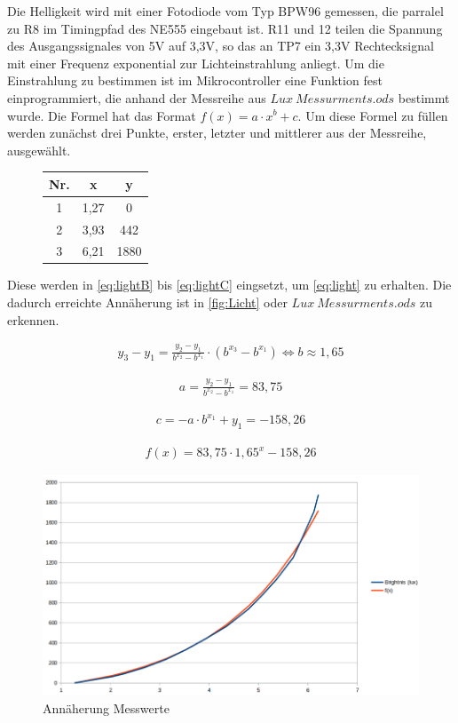 \documentclass[12pt, a4paper, oneside]{report}
\begin{document}
Die Helligkeit wird mit einer Fotodiode vom Typ BPW96 \cite{ds:light} gemessen, die parralel zu R8 im Timingpfad des NE555 eingebaut ist. R11 und 12 teilen die Spannung des Ausgangssignales von 5V auf 3,3V, so das an TP7 ein 3,3V Rechtecksignal mit einer Frequenz exponential zur Lichteinstrahlung anliegt. Um die Einstrahlung zu bestimmen ist im Mikrocontroller eine Funktion fest einprogrammiert, die anhand der Messreihe aus $Lux~Messurments.ods$ bestimmt wurde. Die Formel hat das Format $f(x)=a \cdot x^b + c$. Um diese Formel zu füllen werden zunächst drei Punkte, erster, letzter und mittlerer aus der Messreihe, ausgewählt.

\begin{figure}[h]
\centering
\begin{tabular}{c|c|c}
	Nr. & x & y\\
	\hline
	1 & 1,27 & 0\\
	2 & 3,93 & 442\\
	3 & 6,21 & 1880\\
\end{tabular}
\end{figure}

Diese werden in \autoref{eq:lightB} bis \ref{eq:lightC} eingsetzt, um \autoref{eq:light} zu erhalten. Die dadurch erreichte Annäherung ist in \autoref{fig:Licht} oder $Lux~Messurments.ods$ zu erkennen.

\begin{align}
y_3-y_1=\frac{y_2-y_1}{b^{x_2}-b^{x_1}}\cdot(b^{x_3}-b^{x_1}) \iff b \approx 1,65
\label{eq:lightB}
\end{align}

\begin{align}
a=\frac{y_2-y_1}{b^{x_2}-b^{x_1}} = 83,75
\label{eq:lightA}
\end{align}

\begin{align}
c = -a\cdot b^{x_1} + y_1 = -158,26
\label{eq:lightC}
\end{align}

\begin{align}
\label{eq:light}
f(x) = 83,75 \cdot 1,65^x -158,26
\end{align}

\begin{figure}[h]
	\centering
	\includegraphics[width=\textwidth]{pic/Aproximation}
	\caption{Annäherung Messwerte}
	\label{fig:Licht}
\end{figure}
\end{document}
